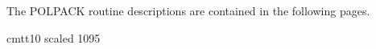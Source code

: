 The POLPACK routine descriptions are contained in the following pages.











\newlength{\sstbannerlength}
\newlength{\sstcaptionlength}
\newlength{\sstexampleslength}
\newlength{\sstexampleswidth}

\newfont{\ssttt} {cmtt10 scaled 1095}

\newcommand{\sstroutine}[3]{
   \newpage
   \label{#1}
   \goodbreak
   \rule{\textwidth} {0.5mm}
   \vspace{-7ex}
   \newline
   \settowidth{\sstbannerlength} {{\Large {\bf #1}}}
   \setlength{\sstcaptionlength} {\textwidth}
   \setlength{\sstexampleslength} {\textwidth}
   \addtolength{\sstbannerlength} {0.5em}
   \addtolength{\sstcaptionlength} {-2.0\sstbannerlength}
   \addtolength{\sstcaptionlength} {-5.0pt}
   \settowidth{\sstexampleswidth} {{\bf Examples:}}
   \addtolength{\sstexampleslength} {-\sstexampleswidth}
   \parbox[t]{\sstbannerlength} {\flushleft{\Large {\bf #1}}}
   \parbox[t]{\sstcaptionlength} {\center{\Large #2}}
   \parbox[t]{\sstbannerlength} {\flushright{\Large {\bf #1}}}
   \begin{description}
      #3
   \end{description}
}

